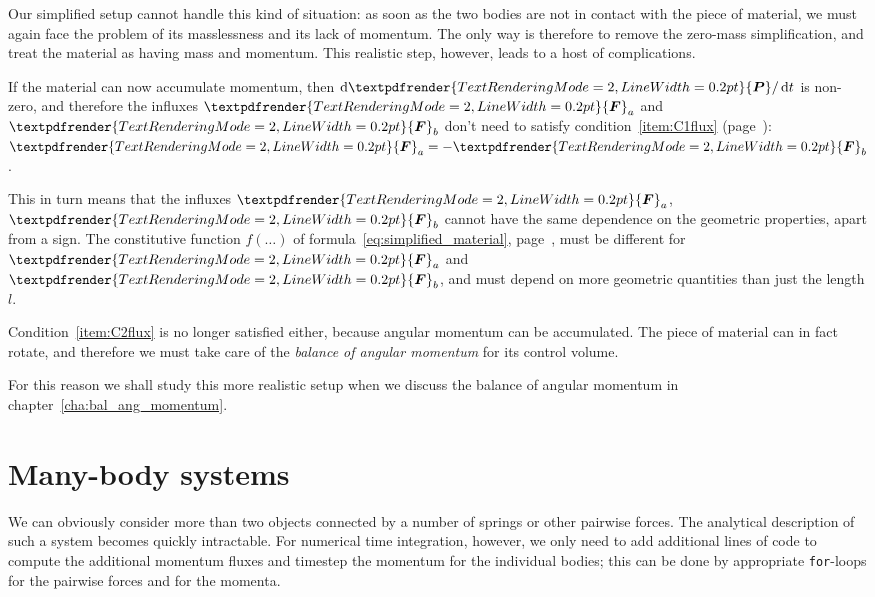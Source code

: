 \documentclass[a4paper,12pt,%
onecolumn,oneside,%
british%
]{memoir}
\renewcommand*{\bm}[1]{\textpdfrender{TextRenderingMode=2,LineWidth=0.2pt}{\boldsymbol{#1}}}
\newcommand*{\di}{\mathop{}\!\mathrm{d}}%
\renewcommand*{\|}[1][]{\nonscript\:#1\vert\nonscript\:\mathopen{}}
\newcommand*{\chap}{chapter}%
\newcommand*{\yle}{l}
\newcommand*{\dt}{\di t}
\newcommand*{\yP}{\bm{P}}
\newcommand*{\yF}{\bm{F}}
\newcommand*{\yFa}{\yF_{a}}
\newcommand*{\yFb}{\yF_{b}}
\begin{document}
Our simplified setup cannot handle this kind of situation: as soon as the two bodies are not in contact with the piece of material, we must again face the problem of its masslessness and its lack of momentum. The only way is therefore to remove the zero-mass simplification, and treat the material as having mass and momentum. This realistic step, however, leads to a host of complications.

If the material can now accumulate momentum, then $\di\yP/\dt$ is non-zero, and therefore the influxes $\yFa$ and $\yFb$ don't need to satisfy condition~\ref{item:C1flux} (page~\pageref{item:C1flux}): $\yFa = -\yFb$.

This in turn means that the influxes $\yFa$, $\yFb$ cannot have the same dependence on the geometric properties, apart from a sign. The constitutive function $f(\dotso)$ of formula~\eqref{eq:simplified_material}, page~\pageref{eq:simplified_material}, must
be different for $\yFa$ and $\yFb$, and must depend on more geometric quantities than just the length $\yle$.

Condition~\ref{item:C2flux} is no longer satisfied either, because angular momentum can be accumulated. The piece of material can in fact rotate, and therefore we must take care of the \emph{balance of angular momentum} for its control volume.

For this reason we shall study this more realistic setup when we discuss the balance of angular momentum in \chap~\ref{cha:bal_ang_momentum}.

\section{Many-body systems}
\label{sec:many-body}

We can obviously consider more than two objects connected by a number of springs or other pairwise forces. The analytical description of such a system becomes quickly intractable. For numerical time integration, however, we only need to add additional lines of code to compute the additional momentum fluxes and timestep the momentum for the individual bodies; this can be done by appropriate \texttt{for}-loops for the pairwise forces and for the momenta.
\end{document}

